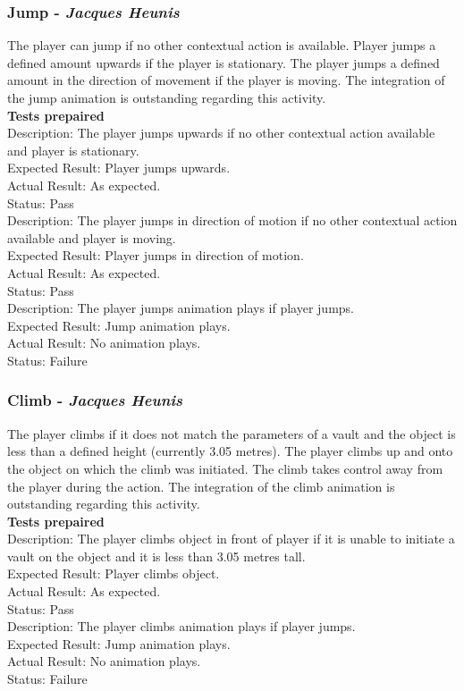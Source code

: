 \documentclass[a4paper,10pt]{article}
\begin{document}
\subsubsection{Jump - \textit{Jacques Heunis}}
The player can jump if no other contextual action is available. Player jumps a defined amount upwards if the player is stationary. The player jumps a defined amount in the direction of movement if the player is moving. The integration of the  jump animation is outstanding regarding this activity.
\smallskip\\\textbf{Tests prepaired}\\
Description: The player jumps upwards if no other contextual action available and player is stationary. \\
Expected Result: Player jumps upwards.\\
Actual Result:  As expected.\\
Status: Pass
\smallskip\\
Description: The player jumps in direction of motion if no other contextual action available and player is moving. \\
Expected Result: Player jumps in direction of motion.\\
Actual Result:  As expected.\\
Status: Pass
\smallskip\\
Description: The player jumps animation plays if player jumps. \\
Expected Result: Jump animation plays.\\
Actual Result:  No animation plays.\\
Status: Failure
\subsubsection{Climb - \textit{Jacques Heunis}}
The player climbs if it does not match the parameters of a vault and the object is less than a defined height (currently 3.05 metres). The player climbs up and onto the object on which the climb was initiated. The climb takes control away from the player during the action. The integration of the climb animation is outstanding regarding this activity.\smallskip\\\textbf{Tests prepaired}\\
Description: The player climbs object in front of player if it is unable to initiate a vault on the object and it is less than 3.05 metres tall. \\
Expected Result: Player climbs object.\\
Actual Result:  As expected.\\
Status: Pass
\smallskip\\
Description: The player climbs animation plays if player jumps. \\
Expected Result: Jump animation plays.\\
Actual Result:  No animation plays.\\
Status: Failure
\end{document}
